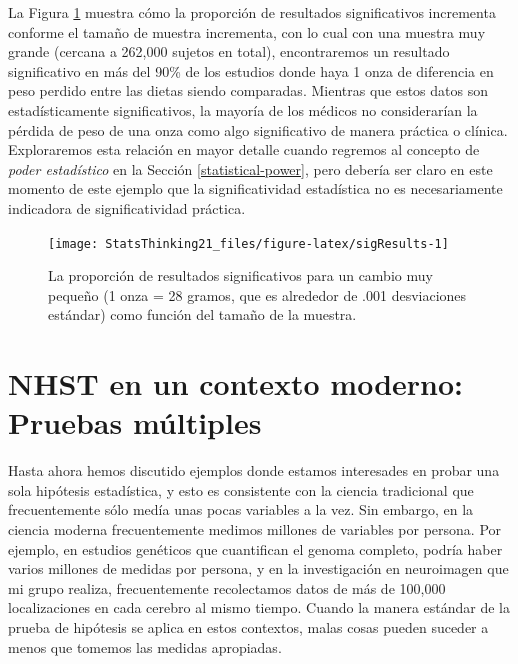 \documentclass[
  12pt,
]{book}
\theoremstyle{definition}
\theoremstyle{definition}
\theoremstyle{definition}
\theoremstyle{remark}
\begin{document}
La Figura \ref{fig:sigResults} muestra cómo la proporción de resultados significativos incrementa conforme el tamaño de muestra incrementa, con lo cual con una muestra muy grande (cercana a 262,000 sujetos en total), encontraremos un resultado significativo en más del 90\% de los estudios donde haya 1 onza de diferencia en peso perdido entre las dietas siendo comparadas. Mientras que estos datos son estadísticamente significativos, la mayoría de los médicos no considerarían la pérdida de peso de una onza como algo significativo de manera práctica o clínica. Exploraremos esta relación en mayor detalle cuando regremos al concepto de \emph{poder estadístico} en la Sección \ref{statistical-power}, pero debería ser claro en este momento de este ejemplo que la significatividad estadística no es necesariamente indicadora de significatividad práctica.

\begin{figure}
\texttt{[image: StatsThinking21\_files/figure-latex/sigResults-1]} \caption{La proporción de resultados significativos para un cambio muy pequeño (1 onza = 28 gramos, que es alrededor de .001 desviaciones estándar) como función del tamaño de la muestra.}\label{fig:sigResults}
\end{figure}

\hypertarget{nhst-en-un-contexto-moderno-pruebas-muxfaltiples}{%
\section{NHST en un contexto moderno: Pruebas múltiples}\label{nhst-en-un-contexto-moderno-pruebas-muxfaltiples}}

Hasta ahora hemos discutido ejemplos donde estamos interesades en probar una sola hipótesis estadística, y esto es consistente con la ciencia tradicional que frecuentemente sólo medía unas pocas variables a la vez. Sin embargo, en la ciencia moderna frecuentemente medimos millones de variables por persona. Por ejemplo, en estudios genéticos que cuantifican el genoma completo, podría haber varios millones de medidas por persona, y en la investigación en neuroimagen que mi grupo realiza, frecuentemente recolectamos datos de más de 100,000 localizaciones en cada cerebro al mismo tiempo. Cuando la manera estándar de la prueba de hipótesis se aplica en estos contextos, malas cosas pueden suceder a menos que tomemos las medidas apropiadas.
\end{document}
